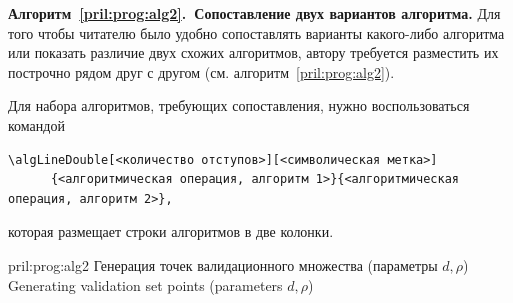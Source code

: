 \documentclass[10pt,a4paper]{book}
\begin{document}
\medskip
\textbf{Алгоритм~\ref{pril:prog:alg2}.~Сопоставление двух вариантов алгоритма.} 
Для того чтобы читателю было удобно сопоставлять варианты какого-либо алгоритма
или показать различие двух схожих алгоритмов, автору требуется разместить их 
построчно рядом друг с другом (см. алгоритм~\ref{pril:prog:alg2}).

Для набора алгоритмов, требующих сопоставления, нужно воспользоваться командой 
\begin{verbatim}
\algLineDouble[<количество отступов>][<символическая метка>]
      {<алгоритмическая операция, алгоритм 1>}{<алгоритмическая операция, алгоритм 2>},
\end{verbatim}
которая размещает строки алгоритмов в две колонки. 

\pagebreak
\begin{nmAlgorithm}{pril:prog:alg2}
      {Генерация точек валидационного множества (параметры $d, \rho$)}
      {Generating validation set points (parameters $d, \rho$)}
\algLineDouble[2]{\ldots}{\ldots}
\algLineDouble[4]{\algENDFOR }{\algENDFOR }
\algLineDouble[3]{\algENDFOR}{\algENDFOR}
\algLineDouble[2]{\algENDFOR}{\algENDFOR}
\algLineDouble[2]{\ldots}{\ldots}
\algLineDouble[1]{\algENDFOR}{\algENDFOR}
\algLineDouble{\algENDFOR}{\algENDFOR}
\algLineDouble{\algSTOP}{\algSTOP}\par
\end{nmAlgorithm}
      
\end{document}
